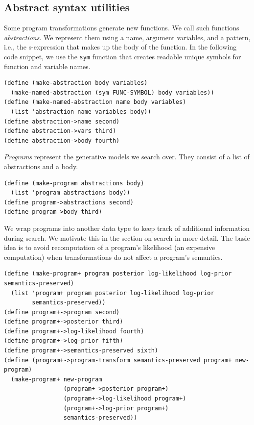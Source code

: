 \documentclass[a4paper,10pt]{article}
\begin{document}
\subsection{Abstract syntax utilities}
Some program transformations generate new functions. We call such functions {\em abstractions}. We represent them using a name, argument variables, and a pattern, i.e., the s-expression that makes up the body of the function. In the following code snippet, we use the \texttt{sym} function that creates readable unique symbols for function and variable names.
\begin{lstlisting}[frame=trbl]
(define (make-abstraction body variables)
  (make-named-abstraction (sym FUNC-SYMBOL) body variables))
(define (make-named-abstraction name body variables)
  (list 'abstraction name variables body))
(define abstraction->name second)
(define abstraction->vars third)
(define abstraction->body fourth)
\end{lstlisting}

{\em Programs} represent the generative models we search over. They consist of a list of abstractions and a body.
\begin{lstlisting}[frame=trbl]
(define (make-program abstractions body)
  (list 'program abstractions body))
(define program->abstractions second)
(define program->body third)
\end{lstlisting}  

We wrap programs into another data type to keep track of additional information during search. We motivate this in the section on search in more detail. The basic idea is to avoid recomputation of a program's likelihood (an expensive computation) when transformations do not affect a program's semantics.
\begin{lstlisting}[frame=trbl]
(define (make-program+ program posterior log-likelihood log-prior semantics-preserved)
  (list 'program+ program posterior log-likelihood log-prior 
        semantics-preserved))
(define program+->program second)
(define program+->posterior third)
(define program+->log-likelihood fourth)
(define program+->log-prior fifth)
(define program+->semantics-preserved sixth)
(define (program+->program-transform semantics-preserved program+ new-program)
  (make-program+ new-program 
                 (program+->posterior program+) 
                 (program+->log-likelihood program+) 
                 (program+->log-prior program+) 
                 semantics-preserved))
\end{lstlisting}
\end{document}
